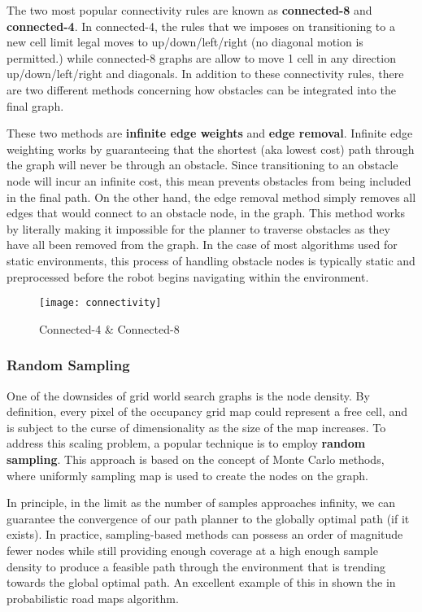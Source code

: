 The two most popular connectivity rules are known as \textbf{connected-8} and \textbf{connected-4}. In connected-4, the rules that we imposes on transitioning to a new cell limit legal moves to up/down/left/right (no diagonal motion is permitted.) while connected-8 graphs are allow to move 1 cell in any direction up/down/left/right and diagonals. In addition to these connectivity rules, there are two different methods concerning how obstacles can be integrated into the final graph. 

These two methods are \textbf{infinite edge weights} and \textbf{edge removal}. Infinite edge weighting works by guaranteeing that the shortest (aka lowest cost) path through the graph will never be through an obstacle. Since transitioning to an obstacle node will incur an infinite cost, this mean prevents obstacles from being included in the final path. On the other hand, the edge removal method simply removes all edges that would connect to an obstacle node, in the graph. This method works by literally making it impossible for the planner to traverse obstacles as they have all been removed from the graph. In the case of most algorithms used for static environments, this process of handling obstacle nodes is typically static and preprocessed before the robot begins navigating within the environment.


\begin{figure}[t]
  \texttt{[image: connectivity]}
  \centering
  \label{fig:connectivity}
  \caption{Connected-4 \& Connected-8}
\end{figure}




\subsubsection{Random Sampling}

One of the downsides of grid world search graphs is the node density. By definition, every pixel of the occupancy grid map could represent a free cell, and is subject to the curse of dimensionality as the size of the map increases. To address this scaling problem, a popular technique is to employ \textbf{random sampling}. This approach is based on the concept of Monte Carlo methods, where uniformly sampling map is used to create the nodes on the graph. 

In principle, in the limit as the number of samples approaches infinity, we can guarantee the convergence of our path planner to the globally optimal path (if it exists). In practice, sampling-based methods can possess an order of magnitude fewer nodes while still providing enough coverage at a high enough sample density to produce a feasible  path through the environment that is trending towards the global optimal path. An excellent example of this in shown the in probabilistic road maps algorithm. 

